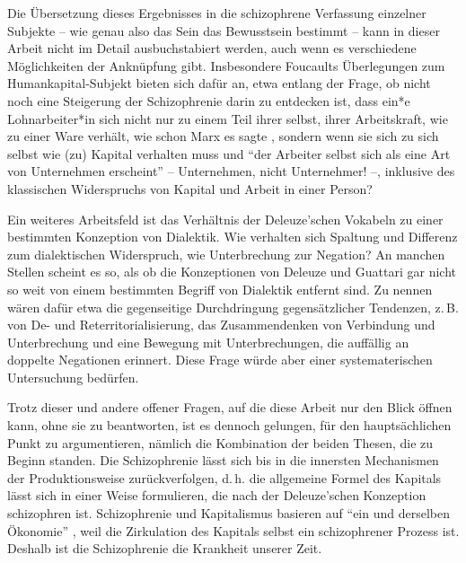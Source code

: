 \documentclass[12pt,
               paper=a4,
               twoside=false,
               onehalfspacing,
               bibliography=totoc,
               toc=graduated,
               ]{scrartcl}
\newcommand{\pc}[2]{\parencite[#1]{#2}}
\newcommand{\vgl}[2]{\parencite[vgl.][#1]{#2}}
\begin{document}
Die Übersetzung dieses Ergebnisses in die schizophrene Verfassung
einzelner Subjekte -- wie genau also das Sein das Bewusstsein bestimmt
-- kann in dieser Arbeit nicht im Detail ausbuchstabiert werden, auch
wenn es verschiedene Möglichkeiten der Anknüpfung gibt. Insbesondere
Foucaults Überlegungen zum Humankapital-Subjekt bieten sich dafür an,
etwa entlang der Frage, ob nicht noch eine Steigerung der
Schizophrenie darin zu entdecken ist, dass ein*e Lohnarbeiter*in sich
nicht nur zu einem Teil ihrer selbst, ihrer Arbeitskraft, wie zu einer
Ware verhält, wie schon Marx es sagte \vgl{182}{kap}, sondern wenn sie
sich zu sich selbst wie (zu) Kapital verhalten muss und "`der Arbeiter
selbst sich als eine Art von Unternehmen erscheint"' \pc{313}{gbp} --
Unternehmen, nicht Unternehmer! --, inklusive des klassischen
Widerspruchs von Kapital und Arbeit in einer Person?

Ein weiteres Arbeitsfeld ist das Verhältnis der Deleuze'schen Vokabeln
zu einer bestimmten Konzeption von Dialektik. Wie verhalten sich
Spaltung und Differenz zum dialektischen Widerspruch, wie
Unterbrechung zur Negation? An manchen Stellen scheint es so, als ob
die Konzeptionen von Deleuze und Guattari gar nicht so weit von einem
bestimmten Begriff von Dialektik entfernt sind. Zu nennen wären dafür
etwa die gegenseitige Durchdringung gegensätzlicher Tendenzen, z.\,B.
von De- und Reterritorialisierung, das Zusammendenken von Verbindung
und Unterbrechung und eine Bewegung mit Unterbrechungen, die auffällig
an doppelte Negationen erinnert. Diese Frage würde aber einer
systematerischen Untersuchung bedürfen.

Trotz dieser und andere offener Fragen, auf die diese Arbeit nur den
Blick öffnen kann, ohne sie zu beantworten, ist es dennoch gelungen,
für den hauptsächlichen Punkt zu argumentieren, nämlich die
Kombination der beiden Thesen, die zu Beginn standen. Die
Schizophrenie lässt sich bis in die innersten Mechanismen der
Produktionsweise zurückverfolgen, d.\,h. die allgemeine Formel des
Kapitals lässt sich in einer Weise formulieren, die nach der
Deleuze'schen Konzeption schizophren ist. Schizophrenie und
Kapitalismus basieren auf "`ein und derselben Ökonomie"' \pc{315}{ao},
weil die Zirkulation des Kapitals selbst ein schizophrener Prozess
ist. Deshalb ist die Schizophrenie die Krankheit unserer Zeit.
\end{document}
